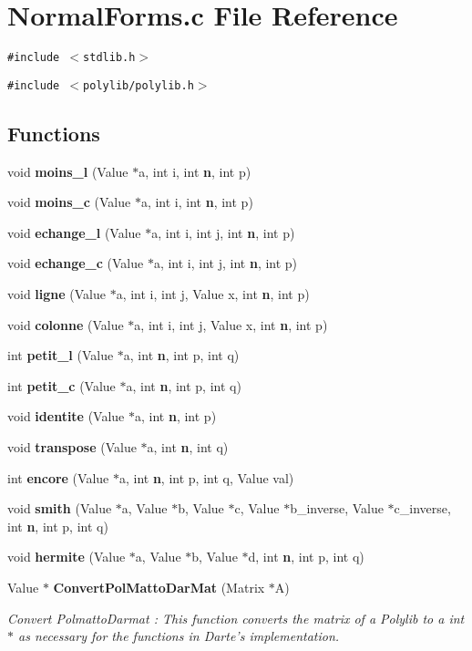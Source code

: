 \section{Normal\-Forms.c File Reference}
\label{NormalForms_8c}
{\tt \#include $<$stdlib.h$>$}\par
{\tt \#include $<$polylib/polylib.h$>$}\par
\subsection*{Functions}
\begin{CompactItemize}
\item 
void {\bf moins\_\-l} (Value $\ast$a, int i, int {\bf n}, int p)
\item 
void {\bf moins\_\-c} (Value $\ast$a, int i, int {\bf n}, int p)
\item 
void {\bf echange\_\-l} (Value $\ast$a, int i, int j, int {\bf n}, int p)
\item 
void {\bf echange\_\-c} (Value $\ast$a, int i, int j, int {\bf n}, int p)
\item 
void {\bf ligne} (Value $\ast$a, int i, int j, Value x, int {\bf n}, int p)
\item 
void {\bf colonne} (Value $\ast$a, int i, int j, Value x, int {\bf n}, int p)
\item 
int {\bf petit\_\-l} (Value $\ast$a, int {\bf n}, int p, int q)
\item 
int {\bf petit\_\-c} (Value $\ast$a, int {\bf n}, int p, int q)
\item 
void {\bf identite} (Value $\ast$a, int {\bf n}, int p)
\item 
void {\bf transpose} (Value $\ast$a, int {\bf n}, int q)
\item 
int {\bf encore} (Value $\ast$a, int {\bf n}, int p, int q, Value val)
\item 
void {\bf smith} (Value $\ast$a, Value $\ast$b, Value $\ast$c, Value $\ast$b\_\-inverse, Value $\ast$c\_\-inverse, int {\bf n}, int p, int q)
\item 
void {\bf hermite} (Value $\ast$a, Value $\ast$b, Value $\ast$d, int {\bf n}, int p, int q)
\item 
Value $\ast$ {\bf Convert\-Pol\-Matto\-Dar\-Mat} (Matrix $\ast$A)
\begin{CompactList}\small\item\em Convert Polmatto\-Darmat : This function converts the matrix of a Polylib to a int $\ast$ as necessary for the functions in Darte's implementation.\item\end{CompactList}\item 

\end{CompactItemize}
